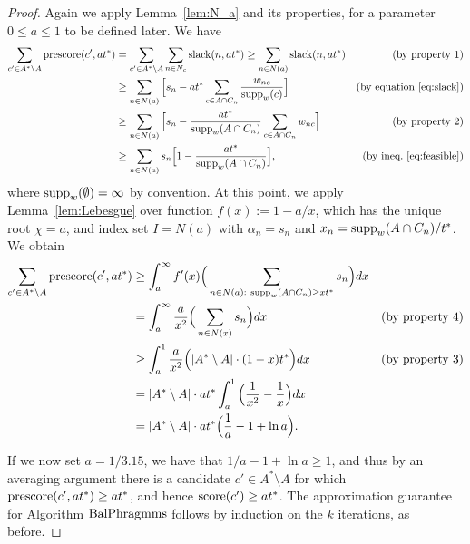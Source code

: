 \begin{proof}
Again we apply Lemma~\ref{lem:N_a} and its properties, for a parameter $0\leq a\leq 1$ to be defined later. We have
\begin{align*}
    \sum_{c'\in A^*\setminus A} \operatorname{prescore}(c',at^*) &= \sum_{c'\in A^*\setminus A} \sum_{n\in N_c} \operatorname{slack}(n, at^*) 
    \geq \sum_{n\in N(a)} \operatorname{slack}(n, at^*) & \text{(by property 1)}\\
    &\geq \sum_{n\in N(a)} \Big[ s_n - at^* \sum_{c\in A\cap C_n} \frac{w_{nc}}{\operatorname{supp}_w(c)} \Big] &\text{(by equation \ref{eq:slack})}\\
    &\geq \sum_{n\in N(a)} \Big[ s_n - \frac{at^*}{\operatorname{supp}_w(A\cap C_n)} \sum_{c\in A\cap C_n} w_{nc} \Big] &\text{(by property 2)}\\
    &\geq \sum_{n\in N(a)} s_n\Big[ 1- \frac{at^*}{\operatorname{supp}_w(A\cap C_n)} \Big], &\text{(by ineq.~\ref{eq:feasible})}
\end{align*}
%
where $\operatorname{supp}_w(\emptyset)=\infty$ by convention. 
At this point, we apply Lemma~\ref{lem:Lebesgue} over function $f(x):=1-a/x$, which has the unique root $\chi=a$, and index set $I=N(a)$ with $\alpha_n=s_n$ and $x_n=\operatorname{supp}_w(A\cap C_n)/t^*$. We obtain
\begin{align*}
    \sum_{c'\in A^*\setminus A} \operatorname{prescore}(c',at^*) &\geq \int_{a}^{\infty} f'(x) \Big( \sum_{n\in N(a): \ \operatorname{supp}_w(A\cap C_n)\geq xt^*} s_n \Big)dx\\
    &=\int_{a}^{\infty} \frac{a}{x^2}\Big( \sum_{n\in N(x)} s_n \Big)dx & \text{(by property 4)}\\
    &\geq \int_{a}^1 \frac{a}{x^2} \Big( |A^*\setminus A|\cdot (1-x)t^* \Big)dx & \text{(by property 3)}\\
    & = |A^*\setminus A|\cdot at^* \int_{a}^1 \Big( \frac{1}{x^2} - \frac{1}{x} \Big)dx \\
		&= |A^*\setminus A|\cdot at^*\Big(\frac{1}{a} - 1 + \ln  a\Big).
\end{align*}

If we now set $a=1/3.15$, we have that $1/a - 1 + \ln a\geq 1$, and thus by an averaging argument there is a candidate $c'\in A^*\setminus A$ for which $\operatorname{prescore}(c',at^*)\geq at^*$, and hence $\operatorname{score}(c')\geq at^*$. The approximation guarantee for Algorithm $\operatorname{BalPhragmms}$ follows by induction on the $k$ iterations, as before.
\end{proof}

